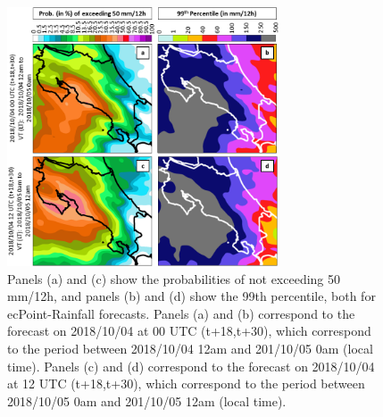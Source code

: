 \documentclass[twocol]{ametsocV5} %
\begin{document}
\begin{figure}
\centerline{\includegraphics[width=19pc]{manuscript/Figures/Results_CaseStudy_Comparison_Prob_Perc.png}}
\caption{Panels (a) and (c) show the probabilities of not exceeding 50 mm/12h, and panels (b) and (d) show the 99th percentile, both for ecPoint-Rainfall forecasts. Panels (a) and (b) correspond to the forecast on 2018/10/04 at 00 UTC (t+18,t+30), which correspond to the period between 2018/10/04 12am and 201/10/05 0am (local time). Panels (c) and (d) correspond to the forecast on 2018/10/04 at 12 UTC (t+18,t+30), which correspond to the period between 2018/10/05 0am and 201/10/05 12am (local time).} 
\label{CaseStudy_Comparison_Prob_Perc}
\end{figure}
\end{document}
